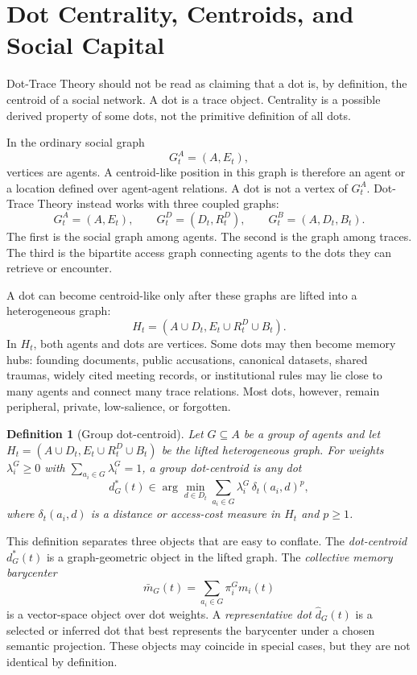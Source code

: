 \documentclass[11pt]{article}
\newtheorem{definition}{Definition}
\theoremstyle{remark}
\begin{document}
\section{Dot Centrality, Centroids, and Social Capital}\label{dot-centrality-centroids-and-social-capital}

Dot-Trace Theory should not be read as claiming that a dot is, by definition, the centroid of a social network. A dot is a trace object. Centrality is a possible derived property of some dots, not the primitive definition of all dots.

In the ordinary social graph
\[
G_t^A=(A,E_t),
\]
vertices are agents. A centroid-like position in this graph is therefore an agent or a location defined over agent-agent relations. A dot is not a vertex of $G_t^A$. Dot-Trace Theory instead works with three coupled graphs:
\[
G_t^A=(A,E_t),\qquad G_t^D=(D_t,R_t^D),\qquad G_t^B=(A,D_t,B_t).
\]
The first is the social graph among agents. The second is the graph among traces. The third is the bipartite access graph connecting agents to the dots they can retrieve or encounter.

A dot can become centroid-like only after these graphs are lifted into a heterogeneous graph:
\[
H_t=(A\cup D_t,E_t\cup R_t^D\cup B_t).
\]
In $H_t$, both agents and dots are vertices. Some dots may then become memory hubs: founding documents, public accusations, canonical datasets, shared traumas, widely cited meeting records, or institutional rules may lie close to many agents and connect many trace relations. Most dots, however, remain peripheral, private, low-salience, or forgotten.

\begin{definition}[Group dot-centroid]
Let $G\subseteq A$ be a group of agents and let $H_t=(A\cup D_t,E_t\cup R_t^D\cup B_t)$ be the lifted heterogeneous graph. For weights $\lambda_i^G\geq 0$ with $\sum_{a_i\in G}\lambda_i^G=1$, a group dot-centroid is any dot
\[
d_G^*(t)\in\arg\min_{d\in D_t}\sum_{a_i\in G}\lambda_i^G\,\delta_t(a_i,d)^p,
\]
where $\delta_t(a_i,d)$ is a distance or access-cost measure in $H_t$ and $p\geq 1$.
\end{definition}

This definition separates three objects that are easy to conflate. The \emph{dot-centroid} $d_G^*(t)$ is a graph-geometric object in the lifted graph. The \emph{collective memory barycenter}
\[
\bar m_G(t)=\sum_{a_i\in G}\pi_i^G m_i(t)
\]
is a vector-space object over dot weights. A \emph{representative dot} $\widehat d_G(t)$ is a selected or inferred dot that best represents the barycenter under a chosen semantic projection. These objects may coincide in special cases, but they are not identical by definition.
\end{document}
